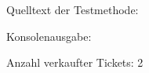 \documentclass{lehramt-informatik-aufgabe}
\begin{document}
\begin{enumerate}
Quelltext der Testmethode:



Konsolenausgabe:

Anzahl verkaufter Tickets: 2

\end{enumerate}
\end{document}
